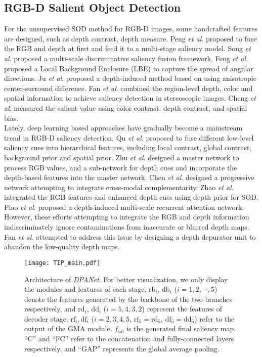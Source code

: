 \documentclass[journal]{IEEEtran}
\def\OURNET{\textit{DPANet}}
\newcommand{\etal}{\textit{et al}.}
\begin{document}
\subsection{RGB-D Salient Object Detection}
For the unsupervised SOD method for RGB-D images, some handcrafted features are designed, such as depth contrast, depth measure. Peng \etal \cite{peng2014rgbd} proposed to fuse the RGB and depth at first and feed it to a multi-stage saliency model. Song \etal \cite{song2017depth}  proposed a multi-scale discriminative saliency fusion framework. Feng \etal \cite{feng2016local} proposed a Local Background Enclosure (LBE) to capture the spread of angular directions.
Ju \etal \cite{ju2014depth} proposed a depth-induced method based on using anisotropic center-surround difference. Fan \etal \cite{fan2014salient} combined the region-level depth, color and spatial information to achieve saliency detection in stereoscopic images. Cheng \etal \cite{cheng2014depth} measured the salient value using color contrast, depth contrast, and spatial bias. \\
\indent Lately, deep learning based approaches have gradually become a mainstream trend in RGB-D saliency detection. Qu \etal \cite{qu2017rgbd} proposed to fuse different low-level saliency cues into hierarchical features, including local contrast, global contrast, background prior and spatial prior. Zhu \etal \cite{zhu2019pdnet} designed a master network to process RGB values, and a sub-network for depth cues and incorporate the depth-based features into the master network. Chen \etal \cite{chen2018progressively} designed a progressive network attempting to integrate cross-modal complementarity. Zhao \etal \cite{zhao2019contrast} integrated the RGB features and enhanced depth cues using depth prior for SOD. Piao \etal \cite{Piao_2019_ICCV} proposed a depth-induced multi-scale recurrent attention network. However, these efforts attempting to integrate the RGB and depth information indiscriminately ignore contaminations from inaccurate or blurred depth maps. Fan \etal \cite{fan2019D3Net} attempted to address this issue by designing a depth depurator unit to abandon the low-quality depth maps.
\begin{figure*}[t]
	 \centering
	\texttt{[image: TIP\_main.pdf]}	
\caption{Architecture of \OURNET. For better visualization, we only display the modules and features of each stage. $\mathrm{rb}_i$, $\mathrm{db}_i$ ($i=1,2,\cdots,5$)	denote the features generated by the backbone of the two branches respectively, and $\mathrm{rd}_i$, $\mathrm{dd}_i$ ($i=5,4,3,2$) represent the features of decoder stage. $\mathrm{rf}_i, \mathrm{df}_i$ ($i=2,3,4,5$, $\mathrm{rf}_5=\mathrm{rd}_5$, $\mathrm{df}_5=\mathrm{dd}_5$) refer to the output of the GMA module. $f_{\mathrm{sal}}$ is the generated final saliency map. ``C'' and ``FC'' refer to the concatenation and fully-connected layers respectively, and ``GAP'' represents the global average pooling.}
	 \label{fig:main_plot}	
\end{figure*}
\end{document}
